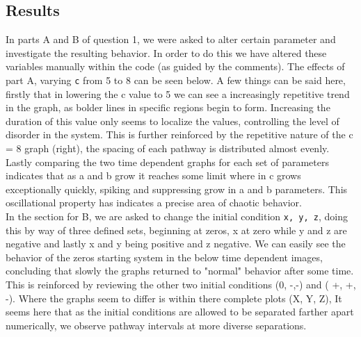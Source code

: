 \documentclass[12pt,letterpaper,notitlepage]{article}
\begin{document}
\subsection{Results}
In parts A and B of question 1, we were asked to alter certain parameter and investigate the resulting behavior. In order to do this we have altered these variables manually within the code (as guided by the comments). 
The effects of part A, varying {\tt c} from 5 to 8 can be seen below. A few things can be said here, firstly that in lowering the c value to 5 we can see a increasingly repetitive trend in the graph, as bolder lines in specific regions begin to form. Increasing the duration of this value only seems to localize the values, controlling the level of disorder in the system. This is further reinforced by the repetitive nature of the c = 8 graph (right), the spacing of each pathway is distributed almost evenly. Lastly comparing the two time dependent graphs for each set of parameters indicates that as a and b grow it reaches some limit where in c grows exceptionally quickly, spiking and suppressing grow in a and b parameters. This oscillational property has indicates a precise area of chaotic behavior. \\
In the section for B, we are asked to change the initial condition {\tt x, y, z}, doing this by way of three defined sets, beginning at zeros, x at zero while y and z are negative and lastly x and y being positive and z negative. We can easily see the behavior of the zeros starting system in the below time dependent images, concluding that slowly the graphs returned to "normal" behavior after some time. This is reinforced by reviewing the other two initial conditions (0, -,-) and ( +, +, -). Where the graphs seem to differ is within there complete plots (X, Y, Z), It seems here that as the initial conditions are allowed to be separated farther apart numerically, we observe pathway intervals at more diverse separations.    
\end{document}
